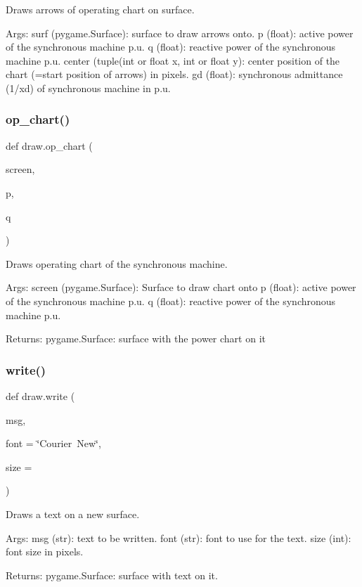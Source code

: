 \begin{DoxyVerb}Draws arrows of operating chart on surface.

Args:
    surf (pygame.Surface): surface to draw arrows onto.
    p (float): active power of the synchronous machine p.u.
    q (float): reactive power of the synchronous machine p.u.
    center (tuple(int or float x, int or float y): center position of
        the chart (=start position of arrows) in pixels.
    gd (float): synchronous admittance (1/xd) of synchronous machine
        in p.u.\end{DoxyVerb}
 \mbox{\label{namespacedraw_a43ef9e3a9bbc75b8eedb246bb405a440}} 
\subsubsection{\texorpdfstring{op\+\_\+chart()}{op\_chart()}}
{\footnotesize\ttfamily def draw.\+op\+\_\+chart (\begin{DoxyParamCaption}\item[{}]{screen,  }\item[{}]{p,  }\item[{}]{q }\end{DoxyParamCaption})}

\begin{DoxyVerb}Draws operating chart of the synchronous machine.

Args:
    screen (pygame.Surface): Surface to draw chart onto
    p (float): active power of the synchronous machine p.u.
    q (float): reactive power of the synchronous machine p.u.

Returns:
    pygame.Surface: surface with the power chart on it\end{DoxyVerb}
 \mbox{\label{namespacedraw_a92f4b47f502e75c973b88f1b2b8cc3fd}} 
\subsubsection{\texorpdfstring{write()}{write()}}
{\footnotesize\ttfamily def draw.\+write (\begin{DoxyParamCaption}\item[{}]{msg,  }\item[{}]{font = {\ttfamily \char`\"{}Courier~New\char`\"{}},  }\item[{}]{size = {} }\end{DoxyParamCaption})}

\begin{DoxyVerb}Draws a text on a new surface.

Args:
    msg (str): text to be written.
    font (str): font to use for the text.
    size (int): font size in pixels.

Returns:
    pygame.Surface: surface with text on it.\end{DoxyVerb}
 